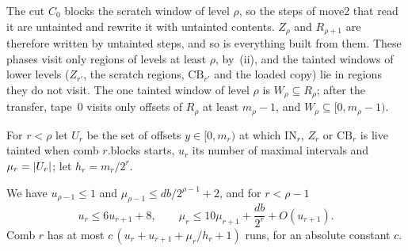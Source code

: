 \begin{informalproof}
The cut $C_0$ blocks the scratch window of level $\rho$, so the steps of move2 that read it are untainted and rewrite it with
untainted contents. $Z_\rho$ and $R_{\rho+1}$ are therefore written by untainted steps, and so is everything built from them. These
phases visit only regions of levels at least $\rho$, by~(ii), and the tainted windows of lower levels ($Z_{r'}$, the scratch regions,
$\mathrm{CB}_{r'}$ and the loaded copy) lie in regions they do not visit. The one tainted window of level $\rho$ is
$W_\rho\subseteq R_\rho$; after the transfer, tape~$0$ visits only offsets of $R_\rho$ at least $m_\rho-1$, and $W_\rho\subseteq[0,m_\rho-1)$.
\end{informalproof}

For $r<\rho$ let $U_r$ be the set of offsets $y\in[0,m_r)$ at which $\mathrm{IN}_r$, $Z_r$ or $\mathrm{CB}_r$ is live tainted when
comb $r$.blocks starts, $u_r$ its number of maximal intervals and $\mu_r=\lvert U_r \rvert$; let $h_r=m_r/2^r$.

\begin{lemma}\label{lem:c3-backward}
\notformalized
We have $u_{\rho-1}\le1$ and $\mu_{\rho-1}\le db/2^{\rho-1}+2$, and for $r<\rho-1$
\[
  u_r\le6u_{r+1}+8,\qquad \mu_r\le10\mu_{r+1}+\frac{db}{2^r}+O(u_{r+1}).
\]
Comb $r$ has at most $c\,(u_r+u_{r+1}+\mu_r/h_r+1)$ runs, for an absolute constant $c$.
\end{lemma}

